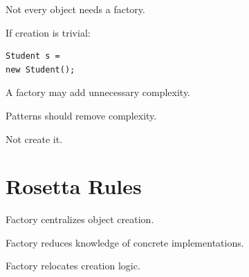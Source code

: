 \documentclass[11pt,a4paper]{book}
\begin{document}
\begin{trap}

Not every object needs
a factory.


If creation is trivial:

\begin{verbatim}
Student s =
new Student();
\end{verbatim}


A factory may add unnecessary
complexity.


Patterns should remove
complexity.


Not create it.

\end{trap}


\section{Rosetta Rules}

\begin{rosettarule}

Factory centralizes object creation.

\end{rosettarule}


\begin{rosettarule}

Factory reduces knowledge of
concrete implementations.

\end{rosettarule}


\begin{rosettarule}

Factory relocates creation logic.

\end{rosettarule}
\end{document}
